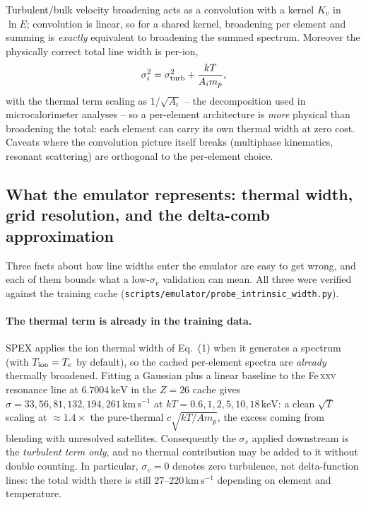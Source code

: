 \documentclass[11pt,a4paper]{article}
\newcommand{\kms}{\,\mathrm{km\,s^{-1}}}
\newcommand{\code}[1]{\texttt{#1}}
\begin{document}
Turbulent/bulk velocity broadening acts as a convolution with a kernel
$K_v$ in $\ln E$; convolution is linear, so for a shared kernel,
broadening per element and summing is \emph{exactly} equivalent to
broadening the summed spectrum. Moreover the physically correct total
line width is per-ion,
\begin{equation}
\sigma_i^2 = \sigma_{\rm turb}^2 + \frac{k T}{A_i m_p},
\end{equation}
with the thermal term scaling as $1/\sqrt{A_i}$
\citep{rybicki79} -- the decomposition used in microcalorimeter
analyses \citep{hitomi16,hitomi18} -- so a per-element architecture is
\emph{more} physical than broadening the total: each element can carry
its own thermal width at zero cost. Caveats where the convolution
picture itself breaks (multiphase kinematics, resonant scattering) are
orthogonal to the per-element choice.

\subsection{What the emulator represents: thermal width, grid resolution,
and the delta-comb approximation}
\label{sec:broadrep}

Three facts about how line widths enter the emulator are easy to get
wrong, and each of them bounds what a low-$\sigma_v$ validation can
mean. All three were verified against the training cache
(\code{scripts/emulator/probe\_intrinsic\_width.py}).

\paragraph{The thermal term is already in the training data.} SPEX
applies the ion thermal width of Eq.~(1) when it generates a spectrum
(with $T_{\rm ion}=T_e$ by default), so the cached per-element spectra
are \emph{already} thermally broadened. Fitting a Gaussian plus a linear
baseline to the Fe\,\textsc{xxv} resonance line at $6.7004\,\mathrm{keV}$
in the $Z=26$ cache gives $\sigma = 33, 56, 81, 132, 194, 261\kms$ at
$kT = 0.6, 1, 2, 5, 10, 18\,\mathrm{keV}$: a clean $\sqrt{T}$ scaling at
$\approx 1.4\times$ the pure-thermal $c\sqrt{kT/A m_p}$, the excess
coming from blending with unresolved satellites. Consequently the
$\sigma_v$ applied downstream is the \emph{turbulent term only}, and no
thermal contribution may be added to it without double counting. In
particular, $\sigma_v = 0$ denotes zero turbulence, not delta-function
lines: the total width there is still $27$--$220\kms$ depending on
element and temperature.
\end{document}
